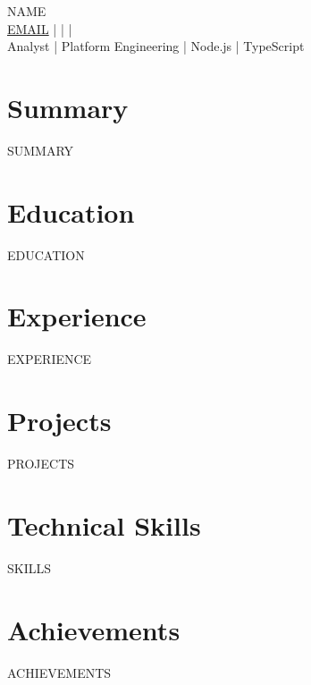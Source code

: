 \documentclass[10pt]{article}
\begin{document}
\begin{center}
{\Large {{NAME}}}\\
\href{mailto:{{EMAIL}}}{{{EMAIL}}} \quad |  \quad |  \quad | \\
Analyst | Platform Engineering | Node.js | TypeScript
\end{center}

\section*{Summary}
{{SUMMARY}}

\section*{Education}
{{EDUCATION}}

\section*{Experience}
{{EXPERIENCE}}

\section*{Projects}
{{PROJECTS}}

\section*{Technical Skills}
{{SKILLS}}

\section*{Achievements}
{{ACHIEVEMENTS}}
\end{document}
